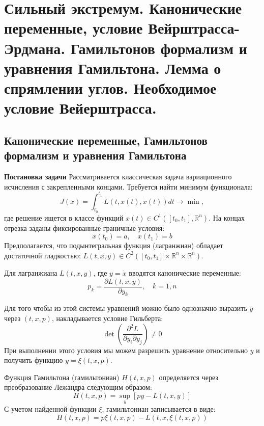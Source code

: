 \section{Сильный экстремум. Канонические переменные, условие Вейрштрасса-Эрдмана. Гамильтонов формализм и уравнения Гамильтона. Лемма о спрямлении углов. Необходимое условие Вейерштрасса.}

\subsection{Канонические переменные, Гамильтонов формализм и уравнения Гамильтона}
\textbf{Постановка задачи}
Рассматривается классическая задача вариационного исчисления с закрепленными концами. Требуется найти минимум функционала:
\begin{equation}
    J(x) = \int_{t_0}^{t_1} L(t, x(t), \dot{x}(t)) dt \rightarrow \min,
\end{equation}
где решение ищется в классе функций $x(t) \in C^1([t_0, t_1], \mathbb{R}^n)$.
На концах отрезка заданы фиксированные граничные условия: 
\begin{equation}
    x(t_0) = a, \quad x(t_1) = b
\end{equation}
Предполагается, что подынтегральная функция (лагранжиан) обладает достаточной гладкостью:
$L(t, x, y) \in C^2([t_0, t_1] \times \mathbb{R}^n \times \mathbb{R}^n)$. 

Для лагранжиана $L(t, x, y)$, где $y = \dot{x}$ вводятся канонические переменные:
$$ p_k = \frac{\partial L(t, x, y)}{\partial y_k}, \quad k = \overline{1, n} $$

Для того чтобы из этой системы уравнений можно было однозначно выразить $y$ через $(t, x, p)$, накладывается условие Гильберта:
$$ \det\left(\frac{\partial^2 L}{\partial y_i \partial y_j}\right) \neq 0 $$
При выполнении этого условия мы можем разрешить уравнение относительно $y$ и получить функцию $y = \xi(t, x, p)$.

Функция Гамильтона (гамильтониан) $H(t, x, p)$ определяется через преобразование Лежандра следующим образом:
$$ H(t, x, p) = \sup_{y} [py - L(t, x, y)] $$
С учетом найденной функции $\xi$, гамильтониан записывается в виде:
$$ H(t, x, p) = p\xi(t, x, p) - L(t, x, \xi(t, x, p)) $$ 

